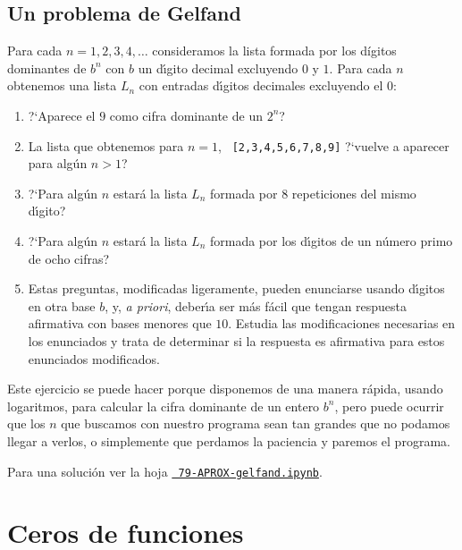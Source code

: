 \subsection{Un problema de Gelfand}
\begin{ejer}
 
Para cada $n=1,2,3,4,\dots$ consideramos la lista formada por los d\'igitos
dominantes de $b^n$ con $b$ un d\'{\i}gito decimal excluyendo $0$ y $1$. Para
cada $n$ obtenemos una lista $L_n$  con entradas d\'{\i}gitos decimales
excluyendo el $0$:

\begin{enumerate}
 \item ?`Aparece el $9$ como cifra dominante de un $2^n$?
 \item La lista que obtenemos para $n=1$, {\tt
[2,3,4,5,6,7,8,9]} ?`vuelve a aparecer para alg\'un $n>1$? 
\item ?`Para alg\'un $n$ estar\'a la lista $L_n$ formada por $8$ repeticiones
del mismo d\'{\i}gito?
\item ?`Para alg\'un $n$ estar\'a la lista $L_n$ formada por los d\'{\i}gitos de
un n\'umero primo de ocho cifras?
 
 \item Estas preguntas, modificadas ligeramente, pueden enunciarse usando
d\'{\i}gitos en otra base $b$, y, {\itshape a priori}, deber\'{\i}a ser m\'as
f\'acil que tengan respuesta afirmativa con bases menores que $10$. Estudia las
modificaciones necesarias en los enunciados y trata de determinar si la
respuesta es afirmativa para estos enunciados modificados.
 \end{enumerate}

 Este ejercicio se puede hacer porque disponemos de una manera r\'apida, usando
logaritmos, para calcular la cifra dominante de un entero $b^n$, pero puede
ocurrir que los $n$ que buscamos con nuestro programa sean tan grandes que no
podamos llegar a verlos, o simplemente que perdamos la paciencia y paremos el
programa.

Para una soluci\'on ver la hoja 
\href{http://localhost:8888/notebooks/APROX/79-APROX-gelfand.ipynb}{\tt
	79-APROX-gelfand.ipynb}.




\end{ejer}

\section{Ceros de funciones}\label{raices}


